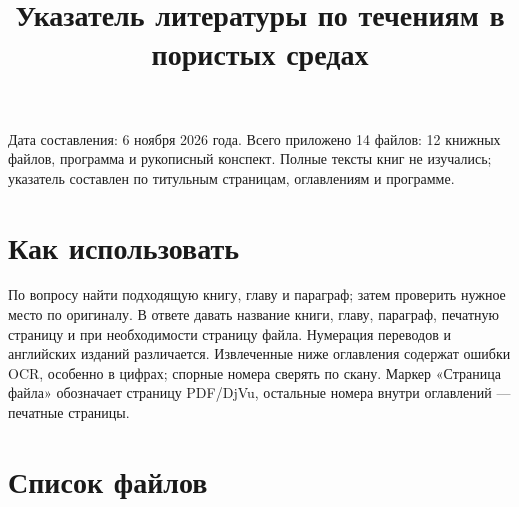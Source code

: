 \documentclass[
  11pt,
]{article}
\title{Указатель литературы по течениям в пористых средах}
\author{}
\date{}
\begin{document}
\maketitle

{
\setcounter{tocdepth}{3}
\tableofcontents
}
Дата составления: 6 ноября 2026 года. Всего приложено 14 файлов: 12 книжных файлов, программа и рукописный конспект. Полные тексты книг не изучались; указатель составлен по титульным страницам, оглавлениям и программе.


\section{Как использовать}\label{section-01}

По вопросу найти подходящую книгу, главу и параграф; затем проверить нужное место по оригиналу. В ответе давать название книги, главу, параграф, печатную страницу и при необходимости страницу файла. Нумерация переводов и английских изданий различается. Извлеченные ниже оглавления содержат ошибки OCR, особенно в цифрах; спорные номера сверять по скану. Маркер «Страница файла» обозначает страницу PDF/DjVu, остальные номера внутри оглавлений --- печатные страницы.


\section{Список файлов}\label{section-02}
\end{document}
